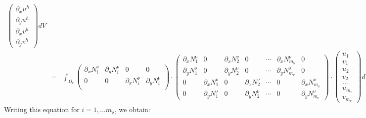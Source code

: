 \begin{eqnarray}
\left(
\begin{array}{c}
\partial_x u^h \\
\partial_y u^h \\
\partial_x v^h \\
\partial_y v^h 
\end{array}
\right) dV \nonumber\\
&=&\int_{\Omega_e}
\left(
\begin{array}{cccc}
\partial_x N_i^\upnu & \partial_y N_i^\upnu & 0 & 0 \\ 
0 & 0 & \partial_x N_i^\upnu & \partial_y N_i^\upnu  \\ 
\end{array}
\right)
\!\cdot\!
\left(
\begin{array}{cccccccccc}
\partial_x N_1^\upnu & 0  & \partial_x N_2^\upnu & 0  & \cdots & \partial_x N^\upnu_{m_\upnu} & 0 \\
\partial_y N_1^\upnu & 0  & \partial_y N_2^\upnu & 0  & \cdots & \partial_y N^\upnu_{m_\upnu} & 0 \\
0 & \partial_x N_1^\upnu  & 0& \partial_x N_2^\upnu  & \cdots & 0 & \partial_x N^\upnu_{m_\upnu}  \\
0 & \partial_y N_1^\upnu  & 0& \partial_y N_2^\upnu  & \cdots & 0 & \partial_y N^\upnu_{m_\upnu}  
\end{array}
\right) 
\!\cdot\!
\left(
\begin{array}{c}
u_1 \\ v_1 \\ u_2 \\ v_2 \\ \dots \\ u_{m_v} \\ v_{m_v} 
\end{array}
\right) dV \nonumber
\end{eqnarray}
Writing this equation for $i=1,...m_\upnu$, we obtain:
